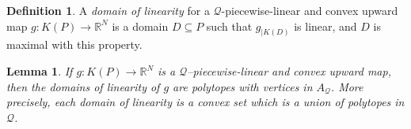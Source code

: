 \documentclass[12pt, a4article]{amsart}   	%
\numberwithin{equation}{section}
\theoremstyle{plain}
\newtheorem{lemma}[theorem]{Lemma}
\theoremstyle{definition}
\newtheorem{definition}[theorem]{Definition}
\newcommand{\R}{{\mathbb R}}
\newcommand{\mcQ}{{\mathcal Q}}
\begin{document}

\begin{definition}\label{def:domain:linearity}
A \emph{domain of linearity} for a $\mathcal{Q}$-piecewise-linear and convex upward map $g:K(P)\to\R^N$ is a domain $D\subseteq P$ 
such that $g_{|K(D)}$ is linear, and $D$ is maximal with this property.
\end{definition}

\begin{lemma}\label{lem:domain:linearity}
If $g:K(P)\to\R^N$ is a $\mcQ$--piecewise-linear and convex upward map,
then the domains of linearity of $g$ are polytopes with vertices in $A_\mcQ$. More precisely,
each domain of linearity is a convex set which is a union of polytopes in $\mcQ$.
\end{lemma}
\end{document}
